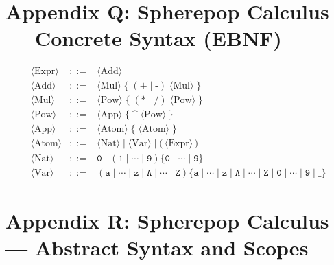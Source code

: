 \documentclass[11pt,oneside]{article}
\begin{document}
\section{Appendix Q: Spherepop Calculus --- Concrete Syntax (EBNF)}

\[
\begin{array}{rcl}

\langle \text{Expr} \rangle
&::=&
\langle \text{Add} \rangle
\\[6pt]

\langle \text{Add} \rangle
&::=&
\langle \text{Mul} \rangle
\;\{\; (\texttt{+}\mid\texttt{-})\; \langle \text{Mul} \rangle \;\}
\\[6pt]

\langle \text{Mul} \rangle
&::=&
\langle \text{Pow} \rangle
\;\{\; (\texttt{*}\mid\texttt{/})\; \langle \text{Pow} \rangle \;\}
\\[6pt]

\langle \text{Pow} \rangle
&::=&
\langle \text{App} \rangle
\;\{\; \texttt{^}\; \langle \text{Pow} \rangle \;\}
\\[6pt]

\langle \text{App} \rangle
&::=&
\langle \text{Atom} \rangle
\;\{\; \langle \text{Atom} \rangle \;\}
\\[6pt]

\langle \text{Atom} \rangle
&::=&
\langle \text{Nat} \rangle
\mid
\langle \text{Var} \rangle
\mid
\texttt{(}\,\langle \text{Expr} \rangle\,\texttt{)}
\\[6pt]

\langle \text{Nat} \rangle
&::=&
\texttt{0}
\mid
(\texttt{1}\mid\cdots\mid\texttt{9})\{\texttt{0}\mid\cdots\mid\texttt{9}\}
\\[6pt]

\langle \text{Var} \rangle
&::=&
(\texttt{a}\mid\cdots\mid\texttt{z}\mid\texttt{A}\mid\cdots\mid\texttt{Z})
\{\texttt{a}\mid\cdots\mid\texttt{z}\mid\texttt{A}\mid\cdots\mid\texttt{Z}\mid\texttt{0}\mid\cdots\mid\texttt{9}\mid\texttt{\_}\}

\end{array}
\]


\section{Appendix R: Spherepop Calculus --- Abstract Syntax and Scopes}
\end{document}
